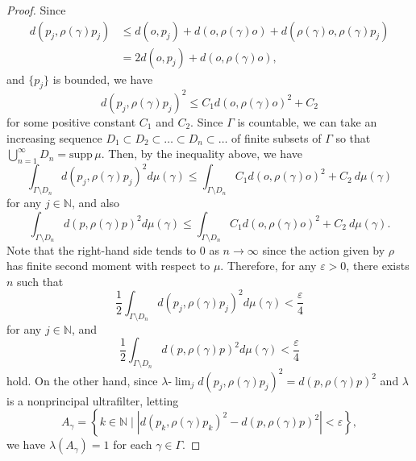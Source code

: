 \documentclass[12pt]{amsart}
\numberwithin{equation}{section}
\theoremstyle{plain}
\theoremstyle{definition}
\theoremstyle{remark}
\newcommand{\N}{{\mathbb N}}
\newcommand{\ulim}{\lambda{\text{-}}\!\lim}
\newcommand{\supp}{\mathrm{supp}\,}
\begin{document}
\begin{proof}
 Since
 \begin{equation*}
 \begin{split}
   d(p_j, \rho(\gamma)p_j) & \leq d(o, p_j) + d(o, \rho(\gamma)o)
    + d(\rho(\gamma)o, \rho(\gamma)p_j) \\
 & = 2d(o, p_j) + d(o, \rho(\gamma)o), 
 \end{split}
 \end{equation*}
 and $\{p_j\}$ is bounded, we have
 \begin{equation*}
 d(p_j, \rho(\gamma)p_j)^2 \leq C_1 d(o, \rho(\gamma)o)^2 + C_2 
 \end{equation*}
 for some positive constant $C_1$ and $C_2$. 
 Since $\Gamma$ is countable, we can take an increasing sequence 
 $D_1 \subset D_2 \subset \dots \subset D_n \subset \dots$ of finite
 subsets of $\Gamma$ so that $\bigcup_{n=1}^{\infty}D_n=\supp \mu$. 
 Then, by the inequality above, we have
 \begin{equation*}
 \int_{\Gamma \setminus D_n} d(p_j, \rho(\gamma)p_j)^2 d\mu(\gamma)
  \leq \int_{\Gamma \setminus D_n} C_1 d(o, \rho(\gamma)o)^2 + C_2 
   \ d\mu(\gamma)
 \end{equation*}
 for any $j \in \N$, and also
 \begin{equation*}
 \int_{\Gamma \setminus D_n} d(p, \rho(\gamma)p)^2 d\mu(\gamma)
 \leq \int_{\Gamma \setminus D_n} C_1 d(o, \rho(\gamma)o)^2+ C_2  
   \ d\mu(\gamma). 
 \end{equation*}
 Note that the right-hand side tends to $0$ as
 $n\to \infty$ since the action given by $\rho$ has finite second
 moment with respect to $\mu$.
 Therefore, for any $\varepsilon>0$,
 there exists $n$ such that
 \begin{equation*}
 \frac{1}{2} \int_{\Gamma \setminus D_n} d(p_j, \rho(\gamma)p_j)^2 
  d\mu(\gamma) < \frac{\varepsilon}{4} 
 \end{equation*}
 for any $j \in \N$, and 
 \begin{equation*}
 \frac{1}{2} \int_{\Gamma \setminus D_n} d(p, \rho(\gamma)p)^2 
  d\mu(\gamma) < \frac{\varepsilon}{4} 
 \end{equation*}
 hold. 
 On the other hand, since 
 $\ulim_j d(p_j, \rho(\gamma)p_j)^2=d(p,\rho(\gamma)p)^2$ and $\lambda$ is
 a nonprincipal ultrafilter, letting 
 \begin{equation*}
 A_{\gamma}=\left\{k \in \N \mid 
 |d(p_k,\rho(\gamma)p_k)^2-d(p,\rho(\gamma)p)^2|<\varepsilon 
 \right\}, 
 \end{equation*}
 we have $\lambda(A_{\gamma})=1$ for each $\gamma \in \Gamma$.  

\end{proof}
\end{document}
